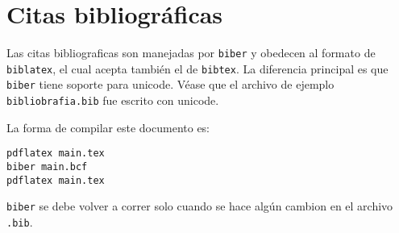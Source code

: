 \documentclass{article}
\begin{document}
\section{Citas bibliográficas}
Las citas bibliograficas son manejadas por \texttt{biber} y obedecen al formato de \texttt{biblatex}, el cual acepta también el de \texttt{bibtex}. La diferencia principal es que \texttt{biber} tiene soporte para unicode. Véase que el archivo de ejemplo \texttt{bibliobrafia.bib} fue escrito con unicode. 


La forma de compilar este documento es:
\begin{verbatim}
pdflatex main.tex
biber main.bcf
pdflatex main.tex
\end{verbatim}
\texttt{biber} se debe volver a correr solo cuando se hace algún cambion en el archivo \texttt{.bib}.
\end{document}
